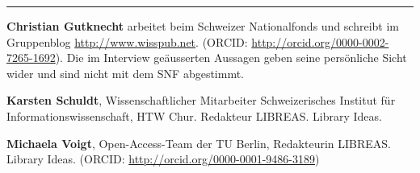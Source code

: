 \begin{center}\rule{0.5\linewidth}{\linethickness}\end{center}

\textbf{Christian Gutknecht} arbeitet beim Schweizer Nationalfonds und
schreibt im Gruppenblog \url{http://www.wisspub.net}. (ORCID:
\url{http://orcid.org/0000-0002-7265-1692}). Die im Interview
geäusserten Aussagen geben seine persönliche Sicht wider und sind nicht
mit dem SNF abgestimmt.

\textbf{Karsten Schuldt}, Wissenschaftlicher Mitarbeiter Schweizerisches
Institut für Informationswissenschaft, HTW Chur. Redakteur LIBREAS.
Library Ideas.

\textbf{Michaela Voigt}, Open-Access-Team der TU Berlin, Redakteurin
LIBREAS. Library Ideas. (ORCID:
\url{http://orcid.org/0000-0001-9486-3189})
